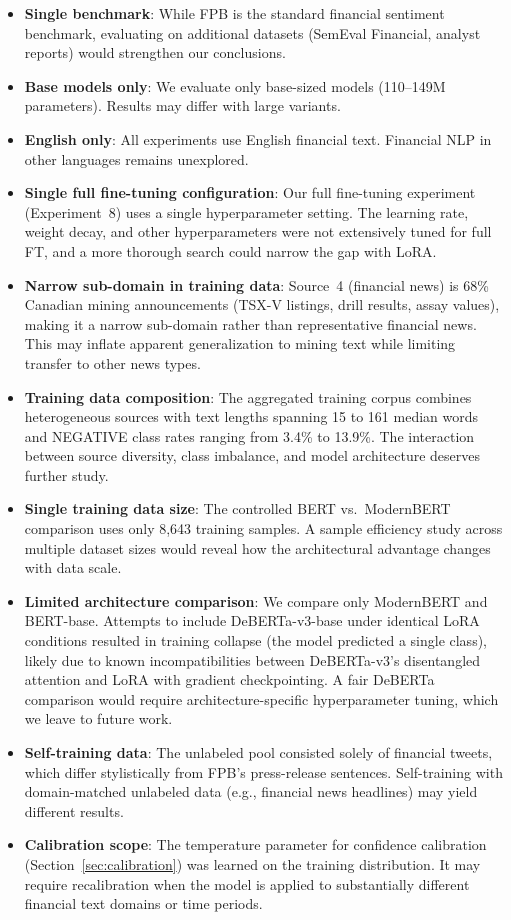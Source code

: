 \documentclass[11pt]{article}
\begin{document}
\begin{itemize}[nosep]
    \item \textbf{Single benchmark}: While FPB is the standard financial sentiment benchmark, evaluating on additional datasets (SemEval Financial, analyst reports) would strengthen our conclusions.
    \item \textbf{Base models only}: We evaluate only base-sized models (110--149M parameters). Results may differ with large variants.
    \item \textbf{English only}: All experiments use English financial text. Financial NLP in other languages remains unexplored.
    \item \textbf{Single full fine-tuning configuration}: Our full fine-tuning experiment (Experiment~8) uses a single hyperparameter setting. The learning rate, weight decay, and other hyperparameters were not extensively tuned for full FT, and a more thorough search could narrow the gap with LoRA.
    \item \textbf{Narrow sub-domain in training data}: Source~4 (financial news) is 68\% Canadian mining announcements (TSX-V listings, drill results, assay values), making it a narrow sub-domain rather than representative financial news. This may inflate apparent generalization to mining text while limiting transfer to other news types.
    \item \textbf{Training data composition}: The aggregated training corpus combines heterogeneous sources with text lengths spanning 15 to 161 median words and NEGATIVE class rates ranging from 3.4\% to 13.9\%. The interaction between source diversity, class imbalance, and model architecture deserves further study.
    \item \textbf{Single training data size}: The controlled BERT vs.\ ModernBERT comparison uses only 8,643 training samples. A sample efficiency study across multiple dataset sizes would reveal how the architectural advantage changes with data scale.
    \item \textbf{Limited architecture comparison}: We compare only ModernBERT and BERT-base. Attempts to include DeBERTa-v3-base \citep{he2021debertav3} under identical LoRA conditions resulted in training collapse (the model predicted a single class), likely due to known incompatibilities between DeBERTa-v3's disentangled attention and LoRA with gradient checkpointing. A fair DeBERTa comparison would require architecture-specific hyperparameter tuning, which we leave to future work.
    \item \textbf{Self-training data}: The unlabeled pool consisted solely of financial tweets, which differ stylistically from FPB's press-release sentences. Self-training with domain-matched unlabeled data (e.g., financial news headlines) may yield different results.
    \item \textbf{Calibration scope}: The temperature parameter for confidence calibration (Section~\ref{sec:calibration}) was learned on the training distribution. It may require recalibration when the model is applied to substantially different financial text domains or time periods.
\end{itemize}
\end{document}
